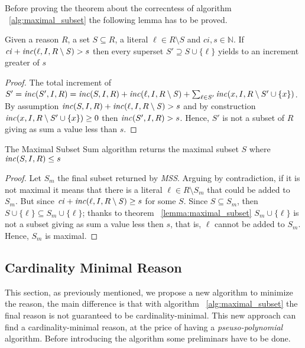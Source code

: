 Before proving the theorem about the correcntess of algorithm ~\ref{alg:maximal_subset}
the following lemma has to be proved.

\begin{lemma}
    \label{lemma:maximal_subset}
    Given a reason $R$, a set $S \subseteq R$, a literal $\ell \in R \setminus S$
    and $\mathit{ci},s \in \mathbb{N}$.
    If $\mathit{ci} +  \mathit{inc}(\ell,I,R \setminus \mathit{S}) > s$
    then every superset  $S' \supseteq S \cup \{\ell\}$ yields to 
    an increment greater of $s$
\end{lemma}

\begin{proof}
    The total increment of $S' = \mathit{inc}(S',I,R) = \mathit{inc}(S,I,R) + \mathit{inc}(\ell,I,R \setminus \mathit{S}) + 
    \sum_{\ell \in S'} \mathit{inc}(x, I, R \setminus S' \cup \{x\})$.
    By assumption $\mathit{inc}(S,I,R) + \mathit{inc}(\ell,I,R \setminus \mathit{S}) > s$  and  by construction $\mathit{inc}(x, I, R \setminus S' \cup \{x\}) \ge 0$ then 
    $\mathit{inc}(S',I,R) > s$.
    Hence, $S'$ is not a subset of $R$ giving as sum a value less than $s$.

\end{proof}

\begin{theorem}
    The Maximal Subset Sum algorithm returns the maximal subset $S$ where $\mathit{inc}(S,I,R) \le s$
\end{theorem}

\begin{proof}
    Let $S_m$ the final subset returned by \textit{MSS}.
    Arguing by contradiction, if it is not maximal 
    it means that there is a literal $\ell \in R \setminus S_m$ that could be
    added to $S_m$.
    But since $\mathit{ci} +  \mathit{inc}(\ell,I,R \setminus \mathit{S}) \ge s$
    for some $S$.
    Since $S \subseteq S_m$, then $S \cup \{\ell\} \subseteq S_m \cup \{\ell\}$;
    thanks to theorem ~\ref{lemma:maximal_subset} $S_m \cup \{\ell\}$
    is not a subset giving as sum a value less then $s$, that is, $\ell$ cannot be 
    added to $S_m$.
    Hence, $S_m$ is maximal.
\end{proof}


\subsection{Cardinality Minimal Reason}
\label{subsec:cardinality_minimal_reason}

This section, as previously mentioned, we propose a new algorithm to minimize the reason,
the main difference is that with algorithm ~\ref{alg:maximal_subset} the final reason 
is not guaranteed to be cardinality-minimal.
This new approach can find a cardinality-minimal reason, at the price of 
having a \textit{pseuso-polynomial} algorithm.
Before introducing the algorithm some preliminars have to be done.

